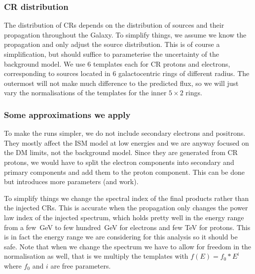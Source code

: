 \documentclass{article}
\begin{document}
\subsubsection*{CR distribution}

   The distribution of CRs depends on the distribution of sources and their
   propagation throughout the Galaxy.  To simplify things, we assume we know
   the propagation and only adjust the source distribution.  This is of course a
   simplification, but should suffice to parameterise the uncertainty of the
   background model.  We use 6 templates each for CR protons
   and electrons, corresponding to sources located in 6 galactocentric rings of
   different radius.  The outermost will not make much difference to the predicted
   flux, so we will just vary the normalisations of the templates for the
   inner $5\times2$ rings.


\subsubsection*{Some approximations we apply}

   To make the runs simpler, we do not include secondary electrons and
   positrons.  They mostly affect the ISM model at low energies and we are
   anyway focused on the DM limits, not the background model.  Since they are
   generated from CR protons, we would have to split the electron components
   into secondary and primary components and add them to the proton component.
   This can be done but introduces more parameters (and work).

   To simplify things we change the spectral index of the final products
   rather than the injected CRs.  This is accurate when the propagation only
   changes the power law index of the injected spectrum, which holds pretty
   well in the energy range from a few\ GeV to few hundred\ GeV for electrons
   and few TeV for protons.  This is in fact the energy range we are
   considering for this analysis so it should be safe.  Note that when we
   change the spectrum we have to allow for freedom in the normalisation as
   well, that is we multiply the templates with $f(E) = f_0 * E^i$ where $f_0$
   and $i$ are free parameters.
\end{document}

